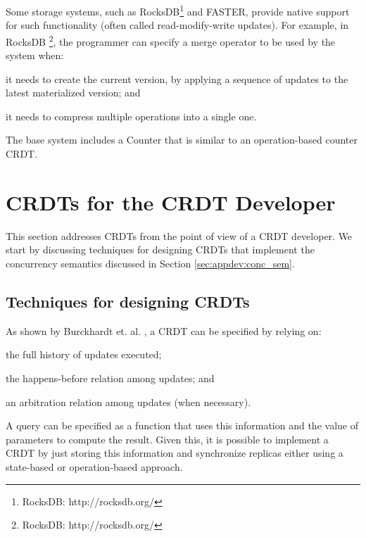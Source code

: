 \documentclass[11pt,a4paper]{article}
\newcommand{\note}[1]{}
\begin{document}
Some storage systems, such as RocksDB\footnote{RocksDB: http://rocksdb.org/} and
FASTER, provide native support for such functionality (often called  
read-modify-write updates). For example, in RocksDB \footnote{RocksDB: http://rocksdb.org/},
the programmer can specify a merge operator to be used by the system when:
\begin{inparaenum}[(i)]
\item it needs to create the current version, by applying a sequence of updates
to the latest materialized version; and
\item it needs to compress multiple operations into a single one.
\end{inparaenum}
The base system includes a Counter that is similar to an operation-based counter 
CRDT.
\note{We have implemented a database that stores other CRDTs on top of RocksDB
by exploring this functionality: \url{https://github.com/preguica/RocksDBCRDTDB}.}




\section{CRDTs for the CRDT Developer}\label{sec:crdtdev}

This section addresses CRDTs from the point of view of a CRDT developer.
We start by discussing techniques for designing CRDTs that implement
the concurrency semantics discussed in Section \ref{sec:appdev:conc_sem}.

\subsection{Techniques for designing CRDTs}

As shown by Burckhardt et. al. \cite{Burckhardt14Replicated}, a CRDT can be
specified by relying on:
\begin{inparaenum}[(i)]
\item the full history of updates executed; 
\item the happens-before relation among updates; and 
\item an arbitration relation among updates (when necessary).
\end{inparaenum}
A query can be specified as a function that uses this information and
the value of parameters to compute the result.
Given this, it is possible to implement a CRDT by just storing 
this information and synchronize replicas either using a state-based or 
operation-based approach. 
\end{document}
